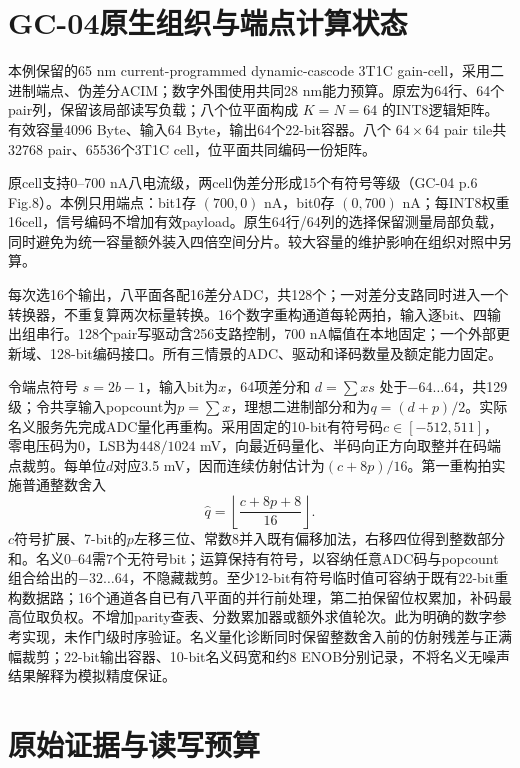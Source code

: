 \section{GC-04原生组织与端点计算状态}

本例保留的65 nm current-programmed dynamic-cascode 3T1C gain-cell，采用二进制端点、伪差分ACIM；数字外围使用共同28 nm能力预算。原宏为64行、64个pair列，保留该局部读写负载；八个位平面构成 $K=N=64$ 的INT8逻辑矩阵。有效容量4096 Byte、输入64 Byte，输出64个22-bit容器。八个 $64\times64$ pair tile共32768 pair、65536个3T1C cell，位平面共同编码一份矩阵。

原cell支持0--700 nA八电流级，两cell伪差分形成15个有符号等级（GC-04 p.6 Fig.8）。本例只用端点：bit1存 $(700,0)$ nA，bit0存 $(0,700)$ nA；每INT8权重16cell，信号编码不增加有效payload。原生64行/64列的选择保留测量局部负载，同时避免为统一容量额外装入四倍空间分片。较大容量的维护影响在组织对照中另算。

每次选16个输出，八平面各配16差分ADC，共128个；一对差分支路同时进入一个转换器，不重复算两次标量转换。16个数字重构通道每轮两拍，输入逐bit、四输出组串行。128个pair写驱动含256支路控制，700 nA幅值在本地固定；一个外部更新域、128-bit编码接口。所有三情景的ADC、驱动和译码数量及额定能力固定。

令端点符号 $s=2b-1$，输入bit为$x$，64项差分和 $d=\sum xs$ 处于$-64\ldots64$，共129级；令共享输入popcount为$p=\sum x$，理想二进制部分和为$q=(d+p)/2$。实际名义服务先完成ADC量化再重构。采用固定的10-bit有符号码$c\in[-512,511]$，零电压码为0，LSB为$448/1024$ mV，向最近码量化、半码向正方向取整并在码端点裁剪。每单位$d$对应3.5 mV，因而连续仿射估计为$(c+8p)/16$。第一重构拍实施普通整数舍入
\[
\widehat q=\left\lfloor\frac{c+8p+8}{16}\right\rfloor.
\]
$c$符号扩展、7-bit的$p$左移三位、常数8并入既有偏移加法，右移四位得到整数部分和。名义0--64需7个无符号bit；运算保持有符号，以容纳任意ADC码与popcount组合给出的$-32\ldots64$，不隐藏裁剪。至少12-bit有符号临时值可容纳于既有22-bit重构数据路；16个通道各自已有八平面的并行前处理，第二拍保留位权累加，补码最高位取负权。不增加parity查表、分数累加器或额外求值轮次。此为明确的数字参考实现，未作门级时序验证。名义量化诊断同时保留整数舍入前的仿射残差与正满幅裁剪；22-bit输出容器、10-bit名义码宽和约8 ENOB分别记录，不将名义无噪声结果解释为模拟精度保证。

\section{原始证据与读写预算}

